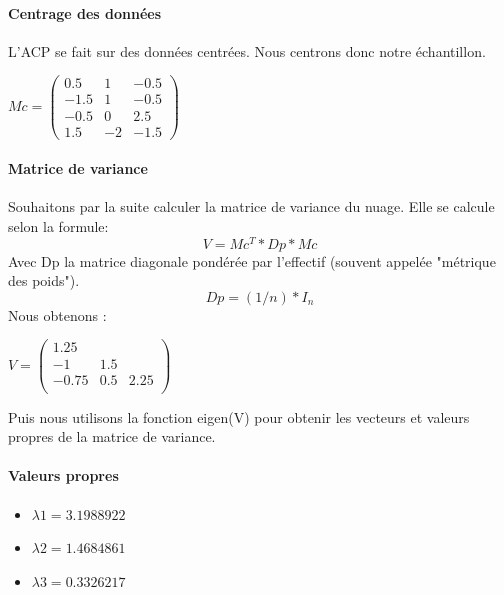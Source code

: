 \documentclass{report}
\begin{document}
\paragraph{Centrage des données}
L'ACP se fait sur des données centrées. Nous centrons donc notre échantillon.
\begin{center}
$Mc = \begin{pmatrix}
    0.5 & 1 & -0.5\\
    -1.5 & 1 & -0.5\\
    -0.5 & 0 & 2.5\\
    1.5 & -2 & -1.5
\end{pmatrix}$
\end{center}
\paragraph{Matrice de variance}
Souhaitons par la suite calculer la matrice de variance du nuage.
Elle se calcule selon la formule:
\begin{equation}
V = Mc^T * Dp * Mc
\end{equation}
Avec Dp la matrice diagonale pondérée par l'effectif (souvent appelée "métrique
des poids").
\begin{equation}
Dp = (1/n) * I_n
\end{equation}
Nous obtenons :
\begin{center}
$V = \begin{pmatrix}
    1.25\\
    -1 & 1.5\\
    -0.75 & 0.5 & 2.25 \\
\end{pmatrix}$
\end{center}
Puis nous utilisons la fonction eigen(V) pour obtenir les vecteurs et valeurs
propres de la matrice de variance.
\paragraph{Valeurs propres}
\begin{itemize}
\item $\lambda1 = 3.1988922$
\item $\lambda2 = 1.4684861$
\item $\lambda3 = 0.3326217$
\end{itemize}
\end{document}
